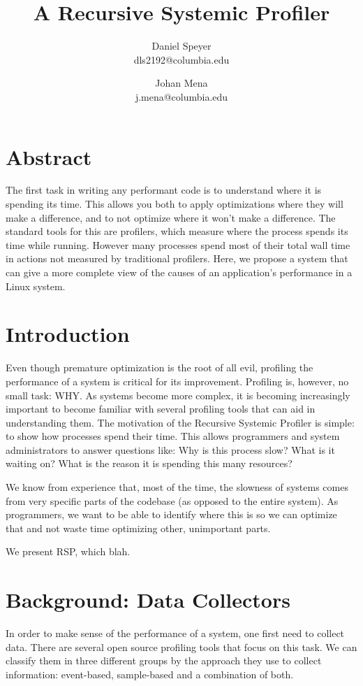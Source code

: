 \documentclass[10pt]{article}
\begin{document}
\author{Daniel Speyer\\dls2192@columbia.edu \and Johan Mena\\j.mena@columbia.edu}
\title{A Recursive Systemic Profiler}

\twocolumn[
\begin{@twocolumnfalse}
\maketitle

\end{@twocolumnfalse}
]

\section{Abstract}
The first task in writing any performant code is to understand where it is spending its time. This allows you both to apply optimizations where they will make a difference, and to not optimize where it won't make a difference. The standard tools for this are profilers, which measure where the process spends its time while running. However many processes spend most of their total wall time in actions not measured by traditional profilers. Here, we propose a system that can give a more complete view of the causes of an application’s performance in a Linux system.
\section{Introduction}
Even though premature optimization is the root of all evil, profiling the performance of a system is critical for its improvement. Profiling is, however, no small task: WHY. As systems become more complex, it is becoming increasingly important to become familiar with several profiling tools that can aid in understanding them. The motivation of the Recursive Systemic Profiler is simple: to show how processes spend their time. This allows programmers and system administrators to answer questions like: Why is this process slow? What is it waiting on? What is the reason it is spending this many resources?

We know from experience that, most of the time, the slowness of systems comes from very specific parts of the codebase (as opposed to the entire system). As programmers, we want to be able to identify where this is so we can optimize that and not waste time optimizing other, unimportant parts.

We present RSP, which blah.
\section{Background: Data Collectors}
In order to make sense of the performance of a system, one first need to collect data. There are several open source profiling tools that focus on this task. We can classify them in three different groups by the approach they use to collect information: event-based, sample-based and a combination of both. 
\end{document}
